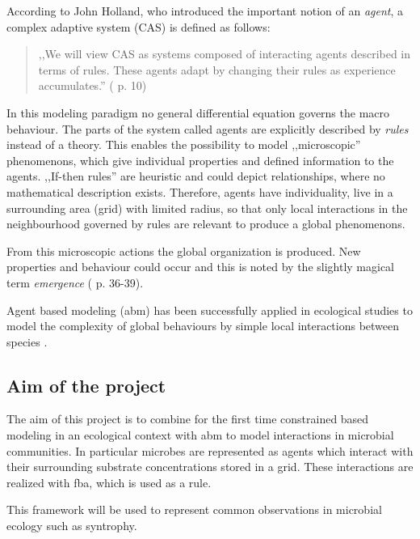 According to John Holland, who introduced the important notion of an \textit{agent}, a complex adaptive system (CAS) is defined as follows:
\begin{quote}
,,We will view CAS as systems composed of interacting agents described in terms of rules. These agents adapt by changing their rules as experience accumulates.'' (\cite{Holland1995} p. 10)
\end{quote}
In this modeling paradigm no general differential equation governs the macro behaviour.
The parts of the system called agents are explicitly described by \textit{rules} instead of a theory.
This enables the possibility to model ,,microscopic'' phenomenons, which give individual properties and defined information to the agents.
,,If-then rules'' are heuristic and could depict relationships, where no mathematical description exists.
Therefore, agents have individuality, live in a surrounding area (grid) with limited radius, so that only local interactions in the neighbourhood governed by rules are relevant to produce a global phenomenons.

From this microscopic actions the global organization is produced.
New properties and behaviour could occur and this is noted by the slightly magical term \textit{emergence} (\cite{Zimmermann2010} p. 36-39).

Agent based modeling (abm) has been successfully applied in ecological studies to model the complexity of global behaviours by simple local interactions between species \cite{Kreft98}.

\subsection{Aim of the project}
The aim of this project is to combine for the first time constrained based modeling in an ecological context with abm to model interactions in microbial communities. In particular microbes are represented as agents which interact with their surrounding substrate concentrations stored in a grid. These interactions are realized with fba, which is used as a rule.

This framework will be used to represent common observations in microbial ecology such as syntrophy.

